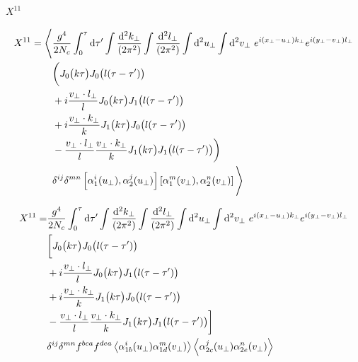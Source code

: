 



$X^{11}$ 

\begin{equation*}
\begin{split}
 X^{11} = \Bigg< &
\frac{g^4}{2 N_c}
\int_0^\tau \mathop{}\!\mathrm{d} \tau'
\int \frac{\mathop{}\!\mathrm{d}^2 k_\perp}{(2\pi^2)}
\int \frac{\mathop{}\!\mathrm{d}^2 l_\perp}{(2\pi^2)}
\int \mathop{}\!\mathrm{d}^2 u_\perp
\int \mathop{}\!\mathrm{d}^2 v_\perp ~
e^{i (x_\perp - u_\perp) k_\perp}
e^{i (y_\perp - v_\perp) l_\perp} \\
& \bigg( J_0\big(k \tau \big) J_0\big(l(\tau-\tau')\big) \\
& +i \frac{v_\perp \cdot l_\perp}{l} J_0\big(k \tau \big) J_1\big(l(\tau-\tau')\big) \\
& +i \frac{v_\perp \cdot k_\perp}{k} J_1\big(k \tau \big) J_0\big(l(\tau-\tau')\big) \\
& - \frac{v_\perp \cdot l_\perp}{l} \frac{v_\perp \cdot k_\perp}{k} J_1\big(k \tau \big) J_1\big(l(\tau-\tau')\big)
\bigg) \\
& \delta^{ij} \delta^{mn} \left[\alpha^i_1 (u_\perp), \alpha_2^j (u_\perp) \right] \left[\alpha^m_1 (v_\perp), \alpha_2^n (v_\perp) \right]\Bigg>
\end{split}
\end{equation*}

\begin{equation*}
\begin{split}
 X^{11} = & 
\frac{g^4}{2 N_c}
\int_0^\tau \mathop{}\!\mathrm{d} \tau'
\int \frac{\mathop{}\!\mathrm{d}^2 k_\perp}{(2\pi^2)}
\int \frac{\mathop{}\!\mathrm{d}^2 l_\perp}{(2\pi^2)}
\int \mathop{}\!\mathrm{d}^2 u_\perp
\int \mathop{}\!\mathrm{d}^2 v_\perp ~
e^{i (x_\perp - u_\perp) k_\perp}
e^{i (y_\perp - v_\perp) l_\perp} \\
& \bigg[ J_0\big(k \tau \big) J_0\big(l(\tau-\tau')\big) \\
& +i \frac{v_\perp \cdot l_\perp}{l} J_0\big(k \tau \big) J_1\big(l(\tau-\tau')\big) \\
& +i \frac{v_\perp \cdot k_\perp}{k} J_1\big(k \tau \big) J_0\big(l(\tau-\tau')\big) \\
& - \frac{v_\perp \cdot l_\perp}{l} \frac{v_\perp \cdot k_\perp}{k} J_1\big(k \tau \big) J_1\big(l(\tau-\tau')\big)
\bigg] \\
& \delta^{ij} \delta^{mn} f^{bca} f^{dea}
\left< \alpha^i_{1b} (u_\perp) \alpha^m_{1d} (v_\perp) \right>  \left< \alpha^j_{2c} (u_\perp) \alpha^n_{2e} (v_\perp) \right> 
\end{split}
\end{equation*}

